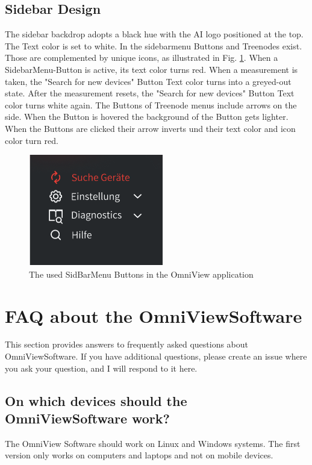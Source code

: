 \documentclass[]{scrreprt}
\begin{document}
\subsection{Sidebar Design}

The sidebar backdrop adopts a black hue with the AI logo positioned at the top. The Text color is set to white. 
In the sidebarmenu Buttons and Treenodes exist. Those are complemented by unique icons, as illustrated in Fig. \ref{fig: SideMenuIcons}.
 When a SidebarMenu-Button is active, its text color turns red. When a measurement is taken, the "Search for new devices" Button Text color turns into a greyed-out state.
  After the measurement resets, the "Search for new devices" Button Text color turns white again. The Buttons of Treenode menus include arrows on the side. 
   When the Button is hovered the background of the Button gets lighter.
 When the Buttons are clicked their arrow inverts und their text color and icon color turn red. 

\begin{figure}
    \includegraphics[width=.4\textwidth]{assets/pictures/SideBarMenuButtons.png}
    \caption[]{The used SidBarMenu Buttons in the OmniView application}
    \label{fig: SideMenuIcons}
\end{figure}


    \section{FAQ about the OmniViewSoftware}

    This section provides answers to frequently asked questions about OmniViewSoftware. If you have additional questions, please create an issue where you ask your question, and I will respond to it here.

    \subsection{On which devices should the OmniViewSoftware work?}

    The OmniView Software should work on Linux and Windows systems. The first version only works on computers and laptops and not on mobile devices.
\end{document}
